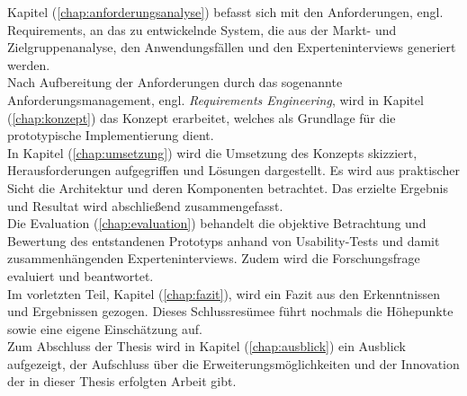     Kapitel (\ref{chap:anforderungsanalyse}) befasst sich mit den Anforderungen, engl. Requirements, an das zu 
    entwickelnde System, die aus der Markt- und Zielgruppenanalyse, den Anwendungsfällen und den Experteninterviews generiert werden. 
    \\
    \linebreak 
    Nach Aufbereitung der Anforderungen durch das sogenannte Anforderungsmanagement, engl. \textit{Requirements Engineering},
    wird in Kapitel (\ref{chap:konzept}) das Konzept erarbeitet, welches als Grundlage für die prototypische Implementierung dient. 
    \\
    \linebreak
    In Kapitel (\ref{chap:umsetzung}) wird die Umsetzung des Konzepts skizziert, Herausforderungen aufgegriffen und Lösungen dargestellt. 
    Es wird aus praktischer Sicht die Architektur und deren Komponenten betrachtet. Das erzielte Ergebnis und Resultat wird 
    abschließend zusammengefasst.
    \\
    \linebreak
    Die Evaluation (\ref{chap:evaluation}) behandelt die objektive Betrachtung und Bewertung des entstandenen Prototyps 
    anhand von Usability-Tests und damit zusammenhängenden Experteninterviews. Zudem wird 
    die Forschungsfrage evaluiert und beantwortet. 
    \\
    \linebreak
    Im vorletzten Teil, Kapitel (\ref{chap:fazit}), wird ein Fazit aus den Erkenntnissen und Ergebnissen gezogen. Dieses Schlussresümee 
    führt nochmals die Höhepunkte sowie eine eigene Einschätzung auf. 
    \\
    \linebreak
    Zum Abschluss der Thesis wird in Kapitel (\ref{chap:ausblick}) ein Ausblick aufgezeigt, der Aufschluss über die Erweiterungsmöglichkeiten 
    und der Innovation der in dieser Thesis erfolgten Arbeit gibt. 
